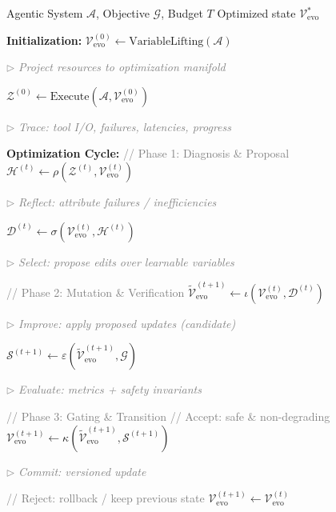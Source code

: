 \begin{algorithm}[t]
  \caption{Reflection Optimizer Evolutionary Loop}
  \label{alg:sepl-loop-appx}
  \newcommand{\algcomment}[1]{\hfill\parbox[t]{0.48\linewidth}{\raggedleft\footnotesize\textcolor{gray}{$\rhd$ \textit{#1}}}}
  \begin{algorithmic}[1]
  \renewcommand{\algorithmicrequire}{\textbf{Input:}}
  \renewcommand{\algorithmicensure}{\textbf{Output:}}
  \REQUIRE Agentic System $\mathcal{A}$, Objective $\mathcal{G}$, Budget $T$
  \ENSURE Optimized state $\mathcal{V}_{\text{evo}}^{*}$

  \STATE \textbf{Initialization:}
  \STATE $\mathcal{V}_{\text{evo}}^{(0)} \leftarrow \text{VariableLifting}(\mathcal{A})$ \algcomment{Project resources to optimization manifold}
  \STATE $\mathcal{Z}^{(0)} \leftarrow \text{Execute}(\mathcal{A}, \mathcal{V}_{\text{evo}}^{(0)})$ \algcomment{Trace: tool I/O, failures, latencies, progress}
  
  \vspace{0.3em}
  \STATE \textbf{Optimization Cycle:}
      \STATE \textcolor{gray}{// Phase 1: Diagnosis \& Proposal}
      \STATE $\mathcal{H}^{(t)} \leftarrow \rho(\mathcal{Z}^{(t)}, \mathcal{V}_{\text{evo}}^{(t)})$ \algcomment{Reflect: attribute failures / inefficiencies}
      \STATE $\mathcal{D}^{(t)} \leftarrow \sigma(\mathcal{V}_{\text{evo}}^{(t)}, \mathcal{H}^{(t)})$ \algcomment{Select: propose edits over learnable variables}
      
      \vspace{0.2em}
      \STATE \textcolor{gray}{// Phase 2: Mutation \& Verification}
      \STATE $\widetilde{\mathcal{V}}_{\text{evo}}^{(t+1)} \leftarrow \iota(\mathcal{V}_{\text{evo}}^{(t)}, \mathcal{D}^{(t)})$ \algcomment{Improve: apply proposed updates (candidate)}
      \STATE $\mathcal{S}^{(t+1)} \leftarrow \varepsilon(\widetilde{\mathcal{V}}_{\text{evo}}^{(t+1)}, \mathcal{G})$ \algcomment{Evaluate: metrics + safety invariants}
      
      \vspace{0.2em}
      \STATE \textcolor{gray}{// Phase 3: Gating \& Transition}
          \STATE \textcolor{gray}{// Accept: safe \& non-degrading}
          \STATE $\mathcal{V}_{\text{evo}}^{(t+1)} \leftarrow \kappa(\widetilde{\mathcal{V}}_{\text{evo}}^{(t+1)}, \mathcal{S}^{(t+1)})$ \algcomment{Commit: versioned update}
      \ELSE
          \STATE \textcolor{gray}{// Reject: rollback / keep previous state}
          \STATE $\mathcal{V}_{\text{evo}}^{(t+1)} \leftarrow \mathcal{V}_{\text{evo}}^{(t)}$
      \ENDIF
      

\end{algorithmic}
\end{algorithm}
